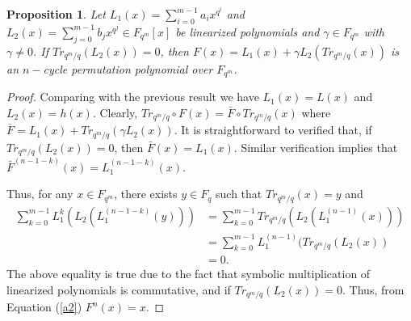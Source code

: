 \documentclass[12pt,a4paper]{article}
\newtheorem{proposition}{Proposition}[section]
\begin{document}
\begin{proposition}\label{p1}
	Let   $ L_{1}(x)=\sum\limits_{i=0}^{m-1}a_{i}x^{q^{i}} $ and $ L_{2}(x)=\sum\limits_{j=0}^{m-1}b_{j}x^{q^{j}} \in F_{q^{m}}[x]$ be linearized polynomials and $ \gamma\in F_{q^{m}} $ with $ \gamma\not=0 $. If $Tr_{q^{m}/q}(L_{2}(x))=0 $, then $ F(x)=L_{1}(x)+\gamma L_{2}(Tr_{q^{m}/q}(x)) $ is an $ n-$cycle permutation polynomial over $ F_{q^{m}} $.  
\end{proposition}
\begin{proof}
	Comparing with the previous result we have  $ L_{1}(x)=L(x) $ and $ L_{2}(x)=h(x) $. Clearly, $ Tr_{q^{m}/q}\circ F(x)=\bar{F}\circ Tr_{q^{m}/q}(x) $ where $ \bar{F}=L_{1}(x)+Tr_{q^{m}/q}(\gamma L_{2}(x)) $. It is straightforward to verified that, if $ Tr_{q^{m}/q}(L_{2}(x))=0 $, then $ \bar{F}(x)=L_{1}(x) $. Similar verification implies that $ \bar{F}^{(n-1-k)}(x)=L_{1}^{(n-1-k)}(x) $.
	
	Thus, for any $ x\in F_{q^{m}} $, there exists $ y\in F_{q} $ such that $ Tr_{q^{m}/q}(x)=y $ and
	\begin{equation}
 \begin{split}
     \sum\limits_{k=0}^{m-1}L_{1}^{k}(L_{2}(L_{1}^{(n-1-k)}(y)))
		&=\sum\limits_{k=0}^{m-1}Tr_{q^{m}/q}(L_{2}(L_{1}^{(n-1)}(x)))\\
		&=\sum\limits_{k=0}^{m-1}L_{1}^{(n-1)}(Tr_{q^{m}/q}(L_{2}(x))\\
		&=0.
 \end{split}
	\end{equation}
	The above equality is true due to the fact that symbolic multiplication of linearized polynomials is commutative, and  if  $ Tr_{q^{m}/q}(L_{2}(x))=0 $. Thus, from Equation (\ref{a2}) $ F^{n}(x)=x $.
\end{proof}
\end{document}
